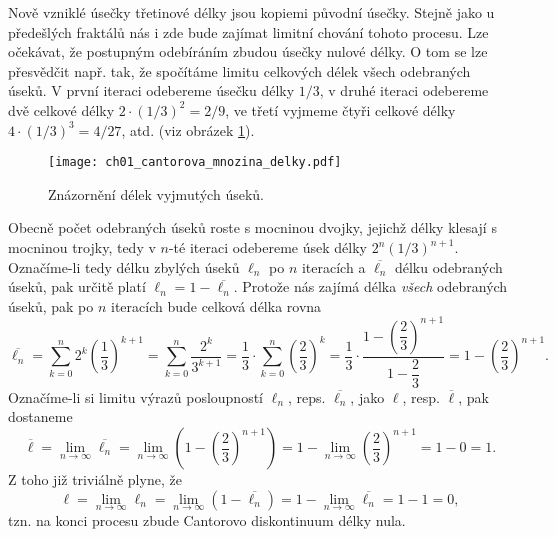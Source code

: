 Nově vzniklé úsečky třetinové délky jsou kopiemi původní úsečky. Stejně jako u předešlých fraktálů nás i zde bude zajímat limitní chování tohoto procesu. Lze očekávat, že postupným odebíráním zbudou úsečky nulové délky. O tom se lze přesvědčit např. tak, že spočítáme limitu celkových délek všech odebraných úseků. V první iteraci odebereme úsečku délky $1/3$, v druhé iteraci odebereme dvě celkové délky $2\cdot(1/3)^2=2/9$, ve třetí vyjmeme čtyři celkové délky $4\cdot(1/3)^3=4/27$, atd. (viz obrázek \ref{fig:cantorovo_diskontinuum_delky}).
\begin{figure}[h]
    \centering
    \texttt{[image: ch01\_cantorova\_mnozina\_delky.pdf]}
    \caption{Znázornění délek vyjmutých úseků.}
    \label{fig:cantorovo_diskontinuum_delky}
\end{figure}
Obecně počet odebraných úseků roste s mocninou dvojky, jejichž délky klesají s mocninou trojky, tedy v $n$-té iteraci odebereme úsek délky $2^n(1/3)^{n+1}$. Označíme-li tedy délku zbylých úseků $\ell_n$ po $n$ iteracích a $\overline{\ell_n}$ délku odebraných úseků, pak určitě platí $\ell_n=1-\overline{\ell_n}$. Protože nás zajímá délka \emph{všech} odebraných úseků, pak po $n$ iteracích bude celková délka rovna
\begin{equation}
    \overline{\ell_n}=\sum_{k=0}^{n}2^k\left(\dfrac{1}{3}\right)^{k+1}=\sum_{k=0}^{n}\dfrac{2^k}{3^{k+1}}=\dfrac{1}{3}\cdot\sum_{k=0}^{n}\left(\dfrac{2}{3}\right)^k=\dfrac{1}{3}\cdot\dfrac{1-\left(\dfrac{2}{3}\right)^{n+1}}{1-\dfrac{2}{3}}=1-\left(\dfrac{2}{3}\right)^{n+1}.
\end{equation}
Označíme-li si limitu výrazů posloupností $\ell_n$, reps. $\overline{\ell_n}$, jako $\ell$, resp. $\overline{\ell}$, pak dostaneme
\begin{equation*}
    \overline{\ell}=\lim_{n\to\infty}\overline{\ell_n}=\lim_{n\to\infty}\left(1-\left(\dfrac{2}{3}\right)^{n+1}\right)=1-\lim_{n\to\infty}\left(\dfrac{2}{3}\right)^{n+1}=1-0=1.
\end{equation*}
Z toho již triviálně plyne, že
\begin{equation}
    \ell=\lim_{n\to\infty}\ell_n=\lim_{n\to\infty}(1-\overline{\ell_n})=1-\lim_{n\to\infty}\overline{\ell_n}=1-1=0,
\end{equation}
tzn. na konci procesu zbude Cantorovo diskontinuum délky nula.